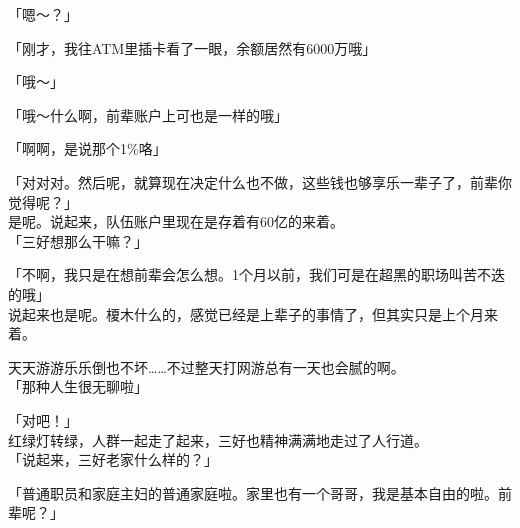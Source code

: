 「嗯～？」

「刚才，我往ATM里插卡看了一眼，余额居然有6000万哦」

「哦～」

「哦～什么啊，前辈账户上可也是一样的哦」

「啊啊，是说那个1\%咯」

「对对对。然后呢，就算现在决定什么也不做，这些钱也够享乐一辈子了，前辈你觉得呢？」\\

是呢。说起来，队伍账户里现在是存着有60亿的来着。\\

「三好想那么干嘛？」

「不啊，我只是在想前辈会怎么想。1个月以前，我们可是在超黑的职场叫苦不迭的哦」\\

说起来也是呢。榎木什么的，感觉已经是上辈子的事情了，但其实只是上个月来着。

天天游游乐乐倒也不坏……不过整天打网游总有一天也会腻的啊。\\

「那种人生很无聊啦」

「对吧！」\\

红绿灯转绿，人群一起走了起来，三好也精神满满地走过了人行道。\\

「说起来，三好老家什么样的？」

「普通职员和家庭主妇的普通家庭啦。家里也有一个哥哥，我是基本自由的啦。前辈呢？」

